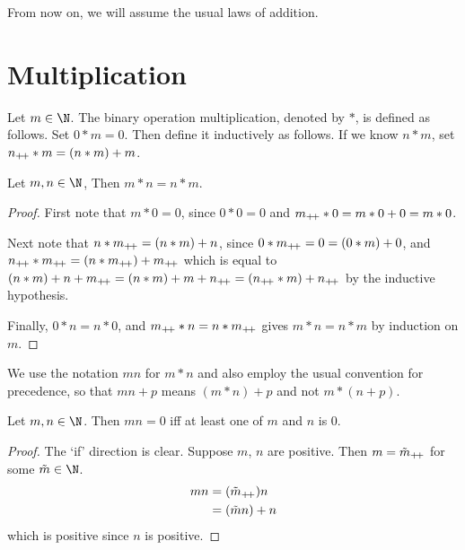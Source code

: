 From now on, we will assume the usual laws of addition.
\section{Multiplication} \label{sec:N:multiplication}

\begin{definition*}[Multiplication] \label{def:N:multiplication}
    Let $m \in \N$.
    The binary operation multiplication, denoted by $*$, is defined as follows.
    Set $0 * m = 0$.
    Then define it inductively as follows.
    If we know $n * m$, set $n_{+\!+} * m = (n * m) + m$.
\end{definition*}

\begin{lemma}
    Let $m, n \in \N$,
    Then $m * n = n * m$.
\end{lemma}
\begin{proof}
    First note that $m * 0 = 0$, since $0 * 0 = 0$ and
    $m_{+\!+} * 0 = m * 0 + 0 = m * 0$.

    Next note that $n * m_{+\!+} = (n * m) + n$, since $0 * m_{+\!+} = 0 = (0 * m) + 0$,
    and $n_{+\!+} * m_{+\!+} = (n * m_{+\!+}) + m_{+\!+}$ which is equal to
    $(n * m) + n + m_{+\!+} = (n * m) + m + n_{+\!+} = (n_{+\!+} * m) + n_{+\!+}$ by the
    inductive hypothesis.

    Finally, $0 * n = n * 0$, and $m_{+\!+} * n = n * m_{+\!+}$ gives
    $m * n = n * m$ by induction on $m$.
\end{proof}

We use the notation $m n$ for $m * n$ and also employ the usual convention for
precedence, so that $m n + p$ means $(m * n) + p$ and not $m * (n + p)$.
\begin{lemma}
    Let $m, n \in \N$.
    Then $m n = 0$ iff at least one of $m$ and $n$ is $0$.
\end{lemma}
\begin{proof}
    The `if' direction is clear.
    Suppose $m$, $n$ are positive.
    Then $m = \tilde{m}_{+\!+}$ for some $\tilde{m} \in \N$.
    \begin{align*}
        m n &= (\tilde{m}_{+\!+}) n \\
            &= (\tilde{m} n) + n
    \end{align*}
    which is positive since $n$ is positive.
\end{proof}

